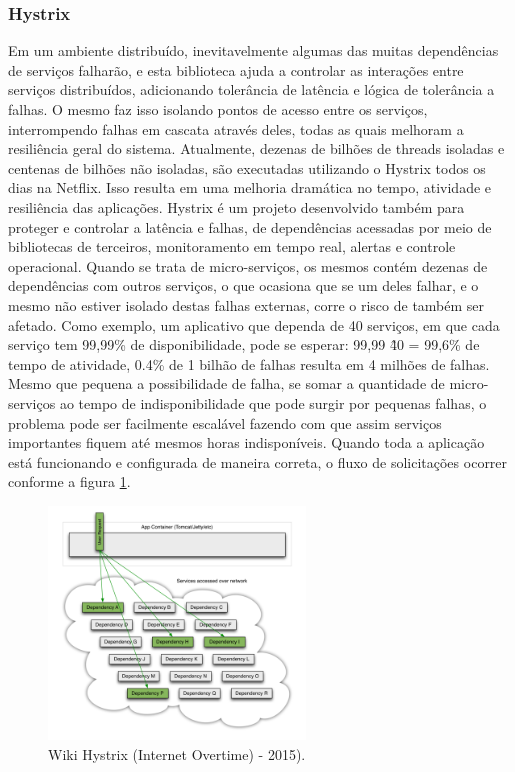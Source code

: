 \documentclass[journal]{IEEEtran}
\begin{document}
\subsubsection{Hystrix}
Em um ambiente distribuído, inevitavelmente algumas das muitas dependências de serviços falharão, e esta biblioteca ajuda a controlar as interações entre serviços distribuídos, adicionando tolerância de latência e lógica de tolerância a falhas. O mesmo faz isso isolando pontos de acesso entre os serviços, interrompendo falhas em cascata através deles, todas as quais melhoram a resiliência geral do sistema. Atualmente, dezenas de bilhões de threads isoladas e centenas de bilhões não isoladas, são executadas utilizando o Hystrix todos os dias na Netflix. Isso resulta em uma melhoria dramática no tempo, atividade e resiliência das aplicações. Hystrix é um projeto desenvolvido também para proteger e controlar a latência e falhas, de dependências acessadas por meio de bibliotecas de terceiros, monitoramento em tempo real, alertas e controle operacional. Quando se trata de micro-serviços, os mesmos contém dezenas de dependências com outros serviços, o que ocasiona que se um deles falhar, e o mesmo não estiver isolado destas falhas externas, corre o risco de também ser afetado. Como exemplo, um aplicativo que dependa de 40 serviços, em que cada serviço tem 99,99\% de disponibilidade, pode se esperar: 99,99 \^ 40 = 99,6\% de tempo de atividade, 0.4\% de 1 bilhão de falhas resulta em 4 milhões de falhas. Mesmo que pequena a possibilidade de falha, se somar a quantidade de micro-serviços ao tempo de indisponibilidade que pode surgir por pequenas falhas, o problema pode ser facilmente escalável fazendo com que assim serviços importantes fiquem até mesmos horas indisponíveis. Quando toda a aplicação está funcionando e configurada de maneira correta, o fluxo de solicitações ocorrer conforme a figura \ref{fig:hystrix-overtime}.

\begin{figure}[h]
\centering
\includegraphics[height=6.2cm]{figura3}
\caption{Wiki Hystrix (Internet Overtime) - 2015).}
\label{fig:hystrix-overtime}
\end{figure}
\end{document}
